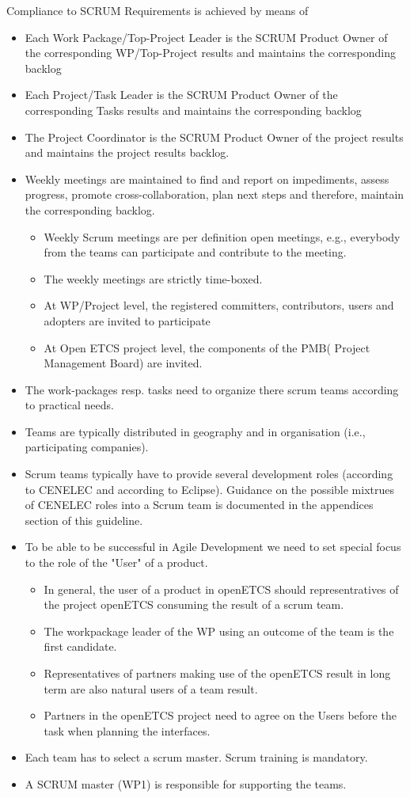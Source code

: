 \documentclass{template/openetcs_article}
\begin{document}
Compliance to SCRUM Requirements is achieved by means of
\begin{itemize}
\item Each Work Package/Top-Project Leader is the SCRUM Product Owner of the corresponding WP/Top-Project results and maintains the corresponding backlog
\item Each Project/Task Leader is the SCRUM  Product Owner of the corresponding Tasks results  and maintains the corresponding backlog
\item The Project Coordinator is the SCRUM Product Owner of the project results and maintains the project results backlog.
\item Weekly meetings are maintained to find and report on impediments, assess progress, promote cross-collaboration, plan next steps and therefore, maintain the corresponding backlog.
\begin{itemize}
\item Weekly Scrum meetings are per definition open meetings, e.g., everybody from the teams can participate and contribute to the meeting.
\item The weekly meetings are strictly time-boxed.
\item At WP/Project level, the registered committers, contributors, users and adopters are invited to participate
\item At Open ETCS project level, the components of the PMB( Project Management Board) are invited.
\end{itemize} 
\item The work-packages resp. tasks need to organize there scrum teams according to practical needs.
\item Teams are typically distributed in geography and in organisation (i.e., participating companies).
\item Scrum teams typically have to provide several development roles (according to CENELEC and according to Eclipse). Guidance on the possible mixtrues of CENELEC roles into a Scrum team is documented in the appendices section of this guideline.
\item To be able to be successful in Agile Development we need to set special focus to the role of the "User" of a product.
\begin{itemize}
\item In general, the user of a product in openETCS should representratives of the project openETCS consuming the result of a scrum team. 
\item The workpackage leader of the WP using an outcome of the team is the first candidate.
\item Representatives of partners making use of the openETCS result in long term are also natural users of a team result.
\item Partners in the openETCS project need to agree on the Users before the task when planning the interfaces. 
\end{itemize}  
\item Each team has to select a scrum master. Scrum training is mandatory.
\item A SCRUM master (WP1) is responsible for supporting the teams.
\end{itemize}
\end{document}
